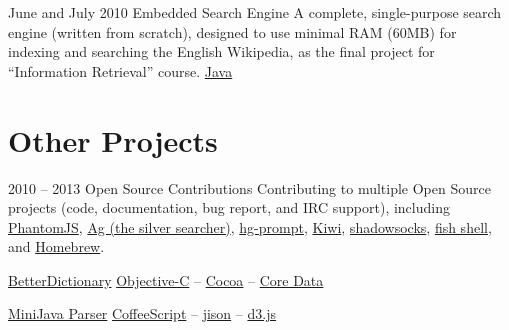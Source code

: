 \documentclass{tccv}
\begin{document}
{{\begin{project_list}
\item{June and July 2010}
	 {}
	 {Embedded Search Engine}
	 {A complete, single-purpose search engine (\mbox{written} from scratch), designed to use minimal RAM (60MB) for indexing and searching the English Wikipedia, as the final project for ``\mbox{Information} Retrieval'' course.}
	 {%
		 \href{http://www.oracle.com/technetwork/java/}{Java}%
	 }

\end{project_list}



\vspace{-10pt}







\section{Other Projects}

\begin{project_list}
	 
\item{2010 -- 2013}
	 {}
	 {Open Source Contributions}
	 {Contributing to multiple Open Source projects (code, documentation, bug report, and IRC support), \mbox{including}
	 \href{http://phantomjs.org}{PhantomJS}, 
	 \href{https://github.com/ggreer/the_silver_searcher}{Ag (the silver searcher)},
	 \href{http://bitbucket.org/sjl/hg-prompt/}{hg-prompt},
	 \href{https://github.com/allending/Kiwi}{Kiwi},
	 \href{https://github.com/clowwindy/shadowsocks/}{shadowsocks}, 
	 \href{http://fishshell.com}{fish shell}, and 
	 \href{https://github.com/mxcl/homebrew}{Homebrew}.}
	 {}
	 
\end{project_list}

\begin{oneline_projects}

\item{\href{http://pooriaazimi.github.io/BetterDictionary/}{BetterDictionary}}
	 {%
	 	\href{https://en.wikipedia.org/wiki/Objective-C}{Objective-C} -- 
		\href{https://en.wikipedia.org/wiki/Cocoa_(API)}{Cocoa} -- 
		\href{https://en.wikipedia.org/wiki/Core_Data}{Core Data}%
	 }	

\item{\href{https://github.com/pooriaazimi/Mini-Java}{MiniJava Parser}}
	 {%
		 \href{http://coffeescript.org}{CoffeeScript} -- 
		 \href{http://zaach.github.io/jison/}{jison} -- 
		 \href{http://d3js.org}{d3.js}%
	 }


\end{oneline_projects}}}
\end{document}
